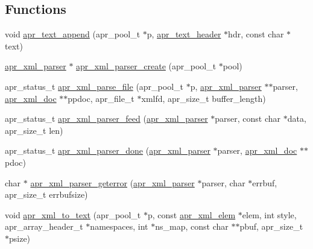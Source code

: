 \subsection*{Functions}
\begin{DoxyCompactItemize}
\item 
void \hyperlink{group___a_p_r___util___x_m_l_gaf63dcaeeda623045860396304007aa49}{apr\-\_\-text\-\_\-append} (apr\-\_\-pool\-\_\-t $\ast$p, \hyperlink{structapr__text__header}{apr\-\_\-text\-\_\-header} $\ast$hdr, const char $\ast$text)
\item 
\hyperlink{group___a_p_r___util___x_m_l_gab08a1c255615afda782318811a5053d9}{apr\-\_\-xml\-\_\-parser} $\ast$ \hyperlink{group___a_p_r___util___x_m_l_ga438b6b9f15ecd8c22a602c9d5f87bd5c}{apr\-\_\-xml\-\_\-parser\-\_\-create} (apr\-\_\-pool\-\_\-t $\ast$pool)
\item 
apr\-\_\-status\-\_\-t \hyperlink{group___a_p_r___util___x_m_l_gad65e09202d9f2eb46cb1d681d7005076}{apr\-\_\-xml\-\_\-parse\-\_\-file} (apr\-\_\-pool\-\_\-t $\ast$p, \hyperlink{group___a_p_r___util___x_m_l_gab08a1c255615afda782318811a5053d9}{apr\-\_\-xml\-\_\-parser} $\ast$$\ast$parser, \hyperlink{structapr__xml__doc}{apr\-\_\-xml\-\_\-doc} $\ast$$\ast$ppdoc, apr\-\_\-file\-\_\-t $\ast$xmlfd, apr\-\_\-size\-\_\-t buffer\-\_\-length)
\item 
apr\-\_\-status\-\_\-t \hyperlink{group___a_p_r___util___x_m_l_ga8b1f79c70267b30bc56a69df0b7d05ca}{apr\-\_\-xml\-\_\-parser\-\_\-feed} (\hyperlink{group___a_p_r___util___x_m_l_gab08a1c255615afda782318811a5053d9}{apr\-\_\-xml\-\_\-parser} $\ast$parser, const char $\ast$data, apr\-\_\-size\-\_\-t len)
\item 
apr\-\_\-status\-\_\-t \hyperlink{group___a_p_r___util___x_m_l_ga69d883e7fcaf0f98d6df69d7ff3ba523}{apr\-\_\-xml\-\_\-parser\-\_\-done} (\hyperlink{group___a_p_r___util___x_m_l_gab08a1c255615afda782318811a5053d9}{apr\-\_\-xml\-\_\-parser} $\ast$parser, \hyperlink{structapr__xml__doc}{apr\-\_\-xml\-\_\-doc} $\ast$$\ast$pdoc)
\item 
char $\ast$ \hyperlink{group___a_p_r___util___x_m_l_gade6ff47b3d0b714e2b61bc1845b47743}{apr\-\_\-xml\-\_\-parser\-\_\-geterror} (\hyperlink{group___a_p_r___util___x_m_l_gab08a1c255615afda782318811a5053d9}{apr\-\_\-xml\-\_\-parser} $\ast$parser, char $\ast$errbuf, apr\-\_\-size\-\_\-t errbufsize)
\item 
void \hyperlink{group___a_p_r___util___x_m_l_ga4485edce130dc1e9a3da3a633a75ffb3}{apr\-\_\-xml\-\_\-to\-\_\-text} (apr\-\_\-pool\-\_\-t $\ast$p, const \hyperlink{structapr__xml__elem}{apr\-\_\-xml\-\_\-elem} $\ast$elem, int style, apr\-\_\-array\-\_\-header\-\_\-t $\ast$namespaces, int $\ast$ns\-\_\-map, const char $\ast$$\ast$pbuf, apr\-\_\-size\-\_\-t $\ast$psize)

\end{DoxyCompactItemize}
